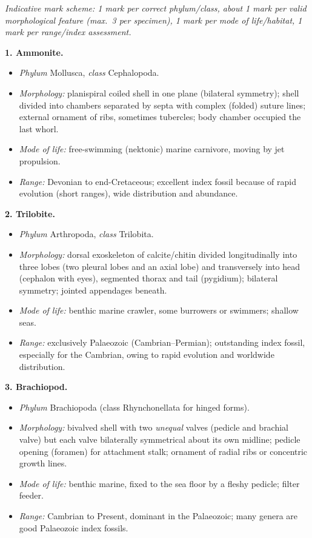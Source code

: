 \documentclass[11pt]{article}
\begin{document}
\begin{corrige}
\emph{Indicative mark scheme: 1 mark per correct phylum/class, about 1 mark per valid morphological feature (max.\ 3 per specimen), 1 mark per mode of life/habitat, 1 mark per range/index assessment.}

\textbf{1. Ammonite.}
\begin{itemize}
\item \emph{Phylum} Mollusca, \emph{class} Cephalopoda.
\item \emph{Morphology:} planispiral coiled shell in one plane (bilateral symmetry); shell divided into chambers separated by septa with complex (folded) suture lines; external ornament of ribs, sometimes tubercles; body chamber occupied the last whorl.
\item \emph{Mode of life:} free-swimming (nektonic) marine carnivore, moving by jet propulsion.
\item \emph{Range:} Devonian to end-Cretaceous; excellent index fossil because of rapid evolution (short ranges), wide distribution and abundance.
\end{itemize}

\textbf{2. Trilobite.}
\begin{itemize}
\item \emph{Phylum} Arthropoda, \emph{class} Trilobita.
\item \emph{Morphology:} dorsal exoskeleton of calcite/chitin divided longitudinally into three lobes (two pleural lobes and an axial lobe) and transversely into head (cephalon with eyes), segmented thorax and tail (pygidium); bilateral symmetry; jointed appendages beneath.
\item \emph{Mode of life:} benthic marine crawler, some burrowers or swimmers; shallow seas.
\item \emph{Range:} exclusively Palaeozoic (Cambrian--Permian); outstanding index fossil, especially for the Cambrian, owing to rapid evolution and worldwide distribution.
\end{itemize}

\textbf{3. Brachiopod.}
\begin{itemize}
\item \emph{Phylum} Brachiopoda (class Rhynchonellata for hinged forms).
\item \emph{Morphology:} bivalved shell with two \emph{unequal} valves (pedicle and brachial valve) but each valve bilaterally symmetrical about its own midline; pedicle opening (foramen) for attachment stalk; ornament of radial ribs or concentric growth lines.
\item \emph{Mode of life:} benthic marine, fixed to the sea floor by a fleshy pedicle; filter feeder.
\item \emph{Range:} Cambrian to Present, dominant in the Palaeozoic; many genera are good Palaeozoic index fossils.
\end{itemize}


\end{corrige}
\end{document}
